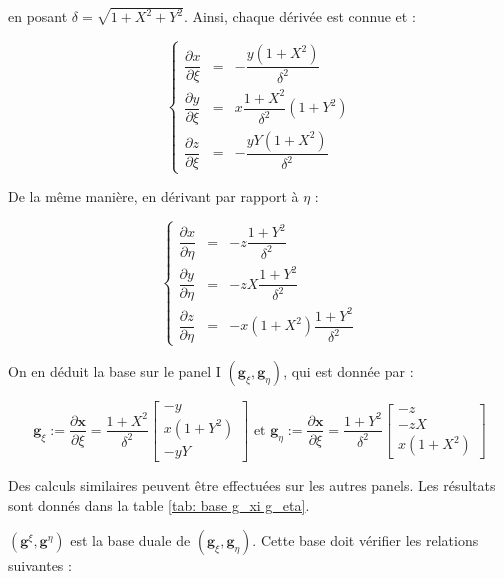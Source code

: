 en posant $\delta = \sqrt{1+X^2+Y^2}$. Ainsi, chaque dérivée est connue et :

\begin{equation}
\left\lbrace
\begin{array}{rcl}
\dfrac{\partial x}{\partial \xi} & = & -\dfrac{y(1+X^2)}{\delta^2}\\
\dfrac{\partial y}{\partial \xi} & = & x \dfrac{1+X^2}{\delta^2} (1+Y^2)\\
\dfrac{\partial z}{\partial \xi} & = & - \dfrac{yY(1+X^2)}{\delta^2}
\end{array}
\right.
\end{equation}

De la même manière, en dérivant par rapport à $\eta$ :

\begin{equation}
\left\lbrace
\begin{array}{rcl}
\dfrac{\partial x}{\partial \eta} & = & - z\dfrac{1+Y^2}{\delta^2}\\
\dfrac{\partial y}{\partial \eta} & = & - zX\dfrac{1+Y^2}{\delta^2}\\
\dfrac{\partial z}{\partial \eta} & = & - x(1+X^2) \dfrac{1+Y^2}{\delta^2}
\end{array}
\right.
\end{equation}

On en déduit la base sur le panel I $\left( \mathbf{g}_{\xi}, \mathbf{g}_{\eta} \right)$, qui est donnée par :

\begin{equation}
\mathbf{g}_{\xi} := \dfrac{\partial \mathbf{x}}{\partial \xi}= \dfrac{1+X^2}{\delta^2} \begin{bmatrix}
-y \\ x(1+Y^2) \\ -yY
\end{bmatrix} \text{ et } \mathbf{g}_{\eta} := \dfrac{\partial \mathbf{x}}{\partial \xi}= \dfrac{1+Y^2}{\delta^2} \begin{bmatrix}
-z \\ -zX \\ x(1+X^2)
\end{bmatrix}
\label{eq: base locale I}
\end{equation}

Des calculs similaires peuvent être effectuées sur les autres panels. Les résultats sont donnés dans la table \ref{tab: base g_xi g_eta}.

$(\mathbf{g}^{\xi}, \mathbf{g}^{\eta})$ est la base duale de $(\mathbf{g}_{\xi}, \mathbf{g}_{\eta})$. Cette base doit vérifier les relations suivantes :

